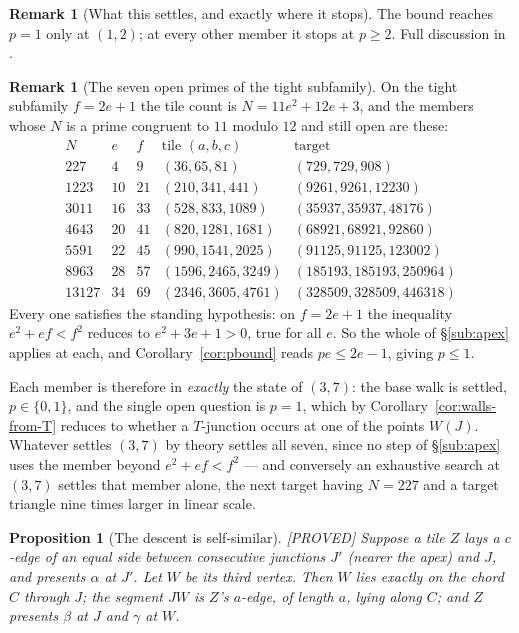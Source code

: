 \documentclass[11pt,reqno]{amsart}
\theoremstyle{plain}
\newtheorem{proposition}[theorem]{Proposition}
\theoremstyle{definition}
\newtheorem{remark}[theorem]{Remark}
\newcommand{\lab}[1]{\hfill\textnormal{\footnotesize\textsc{[#1]}}}
\begin{document}
\begin{remark}[What this settles, and exactly where it stops]\label{rem:apexscope}
The bound reaches $p=1$ only at $(1,2)$; at every other member it stops at $p\ge2$. Full discussion in \cite{Obstructions}.
\end{remark}

\begin{remark}[The seven open primes of the tight subfamily]\label{rem:sevenprimes}
On the tight subfamily $f=2e+1$ the tile count is $N=11e^{2}+12e+3$, and the members whose $N$ is a
prime congruent to $11$ modulo $12$ and still open are these:
\[
\begin{array}{rrrll}
N & e & f & \text{tile }(a,b,c) & \text{target}\\\hline
227 & 4 & 9 & (36,65,81) & (729,729,908)\\
1223 & 10 & 21 & (210,341,441) & (9261,9261,12230)\\
3011 & 16 & 33 & (528,833,1089) & (35937,35937,48176)\\
4643 & 20 & 41 & (820,1281,1681) & (68921,68921,92860)\\
5591 & 22 & 45 & (990,1541,2025) & (91125,91125,123002)\\
8963 & 28 & 57 & (1596,2465,3249) & (185193,185193,250964)\\
13127 & 34 & 69 & (2346,3605,4761) & (328509,328509,446318)
\end{array}
\]
Every one satisfies the standing hypothesis: on $f=2e+1$ the inequality $e^{2}+ef<f^{2}$ reduces to
$e^{2}+3e+1>0$, true for all $e$. So the whole of \S\ref{sub:apex} applies at each, and
Corollary~\ref{cor:pbound} reads $pe\le 2e-1$, giving $p\le1$.

Each member is therefore in \emph{exactly} the state of $(3,7)$: the base walk is settled,
$p\in\{0,1\}$, and the single open question is $p=1$, which by
Corollary~\ref{cor:walls-from-T} reduces to whether a $T$-junction occurs at one of the points
$W(J)$. Whatever settles $(3,7)$ by theory settles all seven, since no step of \S\ref{sub:apex} uses
the member beyond $e^{2}+ef<f^{2}$ --- and conversely an exhaustive search at $(3,7)$ settles that
member alone, the next target having $N=227$ and a target triangle nine times larger in linear scale.
\end{remark}


\begin{proposition}[The descent is self-similar]\label{prop:selfsim}\lab{PROVED}
Suppose a tile $Z$ lays a $c$-edge of an equal side between consecutive junctions $J'$ (nearer the
apex) and $J$, and presents $\alpha$ at $J'$. Let $W$ be its third vertex. Then $W$ lies \emph{exactly}
on the chord $C$ through $J$; the segment $JW$ is $Z$'s $a$-edge, of length $a$, lying along $C$; and
$Z$ presents $\beta$ at $J$ and $\gamma$ at $W$.
\end{proposition}
\end{document}
